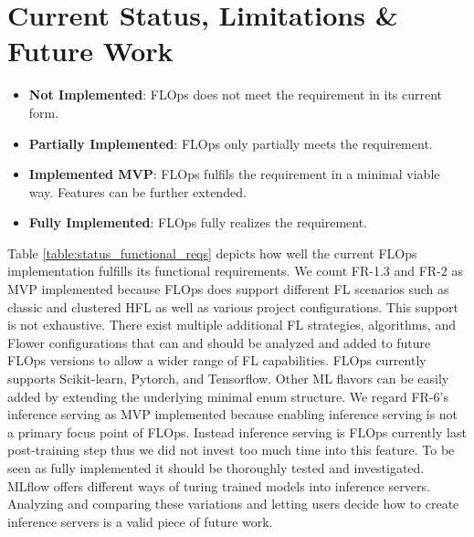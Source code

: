 \section{Current Status, Limitations \& Future Work}

\begin{itemize}
    \item [\faCircleO] \textbf{Not Implemented}: FLOps does not meet the requirement in its current form. 
	\item [\faDotCircleO] \textbf{Partially Implemented}: FLOps only partially meets the requirement.
	\item [\faArrowCircleRight] \textbf{Implemented MVP}: FLOps fulfils the requirement in a minimal viable way. Features can be further extended.
	\item [\faCircle] \textbf{Fully Implemented}: FLOps fully realizes the requirement.
\end{itemize}



Table \ref{table:status_functional_reqs} depicts how well the current FLOps implementation fulfills its functional requirements.
We count FR-1.3 and FR-2 as MVP implemented because FLOps does support different FL scenarios such as classic and clustered HFL as well as various project configurations.
This support is not exhaustive.
There exist multiple additional FL strategies, algorithms, and Flower configurations that can and should be analyzed and added to future FLOps versions to allow a wider range of FL capabilities.
FLOps currently supports Scikit-learn, Pytorch, and Tensorflow.
Other ML flavors can be easily added by extending the underlying minimal enum structure.
We regard FR-6's inference serving as MVP implemented because enabling inference serving is not a primary focus point of FLOps.
Instead inference serving is FLOps currently last post-training step thus we did not invest too much time into this feature.
To be seen as fully implemented it should be thoroughly tested and investigated.
MLflow offers different ways of turing trained models into inference servers.
Analyzing and comparing these variations and letting users decide how to create inference servers is a valid piece of future work.

